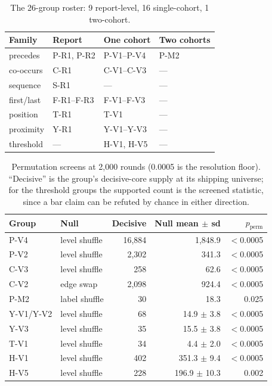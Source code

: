 \begin{table}[htbp]
\centering
\small
\begin{tabular}{llll}
\toprule
Family & Report & One cohort & Two cohorts \\
\midrule
precedes & P-R1, P-R2 & P-V1--P-V4 & P-M2 \\
co-occurs & C-R1 & C-V1--C-V3 & --- \\
sequence & S-R1 & --- & --- \\
first/last & F-R1--F-R3 & F-V1--F-V3 & --- \\
position & T-R1 & T-V1 & --- \\
proximity & Y-R1 & Y-V1--Y-V3 & --- \\
threshold & --- & H-V1, H-V5 & --- \\
\bottomrule
\end{tabular}
\caption{The 26-group roster: 9 report-level, 16 single-cohort, 1 two-cohort.}
\label{tab:roster}
\end{table}

\begin{table}[htbp]
\centering
\small
\setlength{\tabcolsep}{4pt}
\begin{tabular}{llrrr}
\toprule
Group & Null & Decisive & Null mean $\pm$ sd & $p_{\textrm{perm}}$ \\
\midrule
P-V4 & level shuffle & 16{,}884 & 1{,}848.9 & $<$0.0005 \\
P-V2 & level shuffle & 2{,}302 & 341.3 & $<$0.0005 \\
C-V3 & level shuffle & 258 & 62.6 & $<$0.0005 \\
C-V2 & edge swap & 2{,}098 & 924.4 & $<$0.0005 \\
P-M2 & label shuffle & 30 & 18.3 & 0.025 \\
Y-V1/Y-V2 & level shuffle & 68 & 14.9 $\pm$ 3.8 & $<$0.0005 \\
Y-V3 & level shuffle & 35 & 15.5 $\pm$ 3.8 & $<$0.0005 \\
T-V1 & level shuffle & 34 & 4.4 $\pm$ 2.0 & $<$0.0005 \\
H-V1 & level shuffle & 402 & 351.3 $\pm$ 9.4 & $<$0.0005 \\
H-V5 & level shuffle & 228 & 196.9 $\pm$ 10.3 & 0.002 \\
\bottomrule
\end{tabular}
\caption{Permutation screens at 2{,}000 rounds (0.0005 is the resolution
floor). ``Decisive'' is the group's decisive-core supply at its shipping
universe; for the threshold groups the supported count is the screened
statistic, since a bar claim can be refuted by chance in either direction.}
\label{tab:screens}
\end{table}

